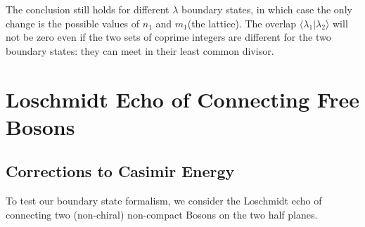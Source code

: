 \documentclass{article}
\begin{document}
The conclusion still holds for different $\lambda$ boundary states, in which case the only change is the possible values of $n_1$ and $m_1$(the lattice). The overlap $\langle \lambda_1 | \lambda_2 \rangle $ will not be zero even if the two sets of coprime integers are different for the two boundary states: they can meet in their least common divisor. 




\section{Loschmidt Echo of Connecting Free Bosons}
\subsection{Corrections to Casimir Energy}

To test our boundary state formalism, we consider the Loschmidt echo of connecting two (non-chiral) non-compact Bosons on the two half planes. 
\end{document}
